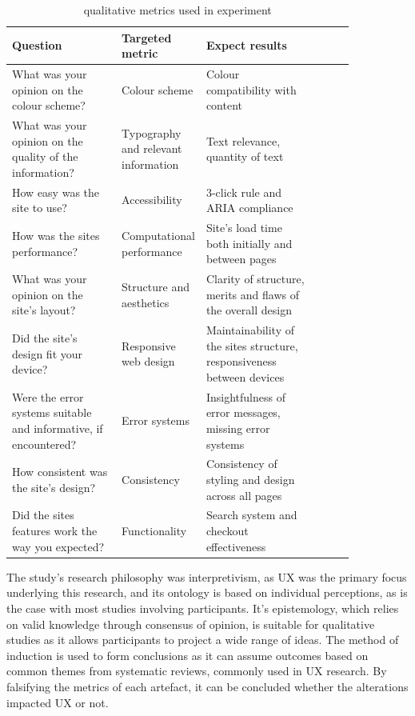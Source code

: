 \documentclass[article]{IEEEtran}
\begin{document}
        \begin{table}[ht]
            \caption{qualitative metrics used in experiment}
            \centering
            \renewcommand{\arraystretch}{1.5}
            
            \begin{tabular}{p{0.32\linewidth} | p{0.21\linewidth} | p{0.32\linewidth} |c|c|c|}
                 \hline
                 \textbf{Question} & \textbf{Targeted metric} & \textbf{Expect results} \\
                 \hline
                 What was your opinion on the colour scheme? & Colour scheme & Colour compatibility with content \\
                 \hline
                 What was your opinion on the quality of the information? & Typography and relevant information & Text relevance, quantity of text \\ 
                 \hline
                 How easy was the site to use? & Accessibility & 3-click rule and ARIA compliance \\
                 \hline
                 How was the sites performance? & Computational performance & Site's load time both initially and between pages \\
                 \hline
                 What was your opinion on the site's layout? & Structure and aesthetics & Clarity of structure, merits and flaws of the overall design \\
                 \hline
                 Did the site's design fit your device? & Responsive web design & Maintainability of the sites structure, responsiveness between devices \\
                 \hline
                 Were the error systems suitable and informative, if encountered? & Error systems & Insightfulness of error messages, missing error systems \\
                 \hline
                 How consistent was the site's design? & Consistency & Consistency of styling and design across all pages \\
                 \hline
                 Did the sites features work the way you expected? & Functionality & Search system and checkout effectiveness \\
                 \hline
            \end{tabular}
            \label{tab:metrics-table}
        \end{table}

        The study's research philosophy was interpretivism, as UX was the primary focus underlying this research, and its ontology is based on individual perceptions, as is the case with most studies involving participants. It's epistemology, which relies on valid knowledge through consensus of opinion, is suitable for qualitative studies as it allows participants to project a wide range of ideas. The method of induction is used to form conclusions as it can assume outcomes based on common themes from systematic reviews, commonly used in UX research. By falsifying the metrics of each artefact, it can be concluded whether the alterations impacted UX or not.
        
\end{document}

